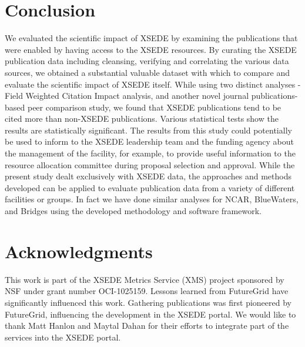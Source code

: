 \documentclass{sig-alternate}
\begin{document}
\section{Conclusion} \label{S:conclusion}

We evaluated the scientific impact of XSEDE by examining the
publications that were enabled by having access to the XSEDE
resources. By curating the XSEDE publication data including cleansing,
verifying and correlating the various data sources, we obtained a
substantial valuable dataset with which to compare and evaluate the
scientific impact of XSEDE itself.  While using two distinct analyses
- Field Weighted Citation Impact analysis, and another novel journal
publications-based peer comparison study, we found that XSEDE
publications tend to be cited more than non-XSEDE publications.
Various statistical tests show the results are statistically
significant.  The results from this study could potentially be used to
inform to the XSEDE leadership team and the funding agency about the
management of the facility, for example, to provide useful information
to the resource allocation committee during proposal selection and
approval.  While the present study dealt exclusively with XSEDE data,
the approaches and methods developed can be applied to evaluate
publication data from a variety of different facilities or groups.  In
fact we have done similar analyses for NCAR, BlueWaters, and Bridges
using the developed methodology and software framework.


\section{Acknowledgments}

This work is part of the XSEDE Metrics Service (XMS) project sponsored
by NSF under grant number OCI-1025159. Lessons learned from FutureGrid
have significantly influenced this work. Gathering publications was
first pioneered by FutureGrid, influencing the development in the XSEDE
portal. We would like to thank Matt Hanlon and Maytal Dahan for their
efforts to integrate part of the services into the XSEDE portal.




\end{document}
